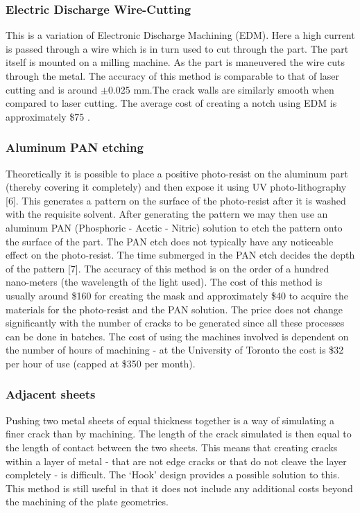 \documentclass[12pt]{article}
\begin{document}
\subsubsection{Electric Discharge Wire-Cutting}
This is a variation of Electronic Discharge Machining (EDM). Here a high current is passed through a wire which is in turn used to cut through the part. The part itself is mounted on a milling machine. As the part is maneuvered the wire cuts through the metal. The accuracy of this method is comparable to that of laser cutting and is around $\pm$0.025 mm.The crack walls are similarly smooth when compared to laser cutting. The average cost of creating a notch using EDM is approximately \$75 .

\subsubsection{Aluminum PAN etching}
Theoretically it is possible to place a positive photo-resist on the aluminum part (thereby covering it completely) and then expose it using UV photo-lithography [6]. This generates a pattern on the surface of the photo-resist after it is washed with the requisite solvent. After generating the pattern we may then use an aluminum PAN (Phosphoric - Acetic - Nitric) solution to etch the pattern onto the surface of the part. The PAN etch does not typically have any noticeable effect on the photo-resist. The time submerged in the PAN etch decides the depth of the pattern [7]. The accuracy of this method is on the order of a hundred nano-meters (the wavelength of the light used). The cost of this method is usually around \$160 for creating the mask and approximately \$40 to acquire the materials for the photo-resist and the PAN solution. The price does not change significantly with the number of cracks to be generated since all these processes can be done in batches. The cost of using the machines involved is dependent on the number of hours of machining - at the University of Toronto the cost is \$32 per hour of use (capped at \$350 per month).

\subsubsection{Adjacent sheets}
Pushing two metal sheets of equal thickness together is a way of simulating a finer crack than by machining. The length of the crack simulated is then equal to the length of contact between the two sheets. This means that creating cracks within a layer of metal - that are not edge cracks or that do not cleave the layer completely - is difficult. The `Hook' design provides a possible solution to this. This method is still useful in that it does not include any additional costs beyond the machining of the plate geometries.
\end{document}

